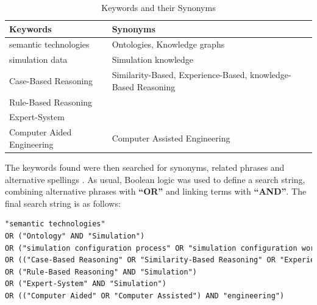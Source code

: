             \begin{table}[h]
                \centering
        	    {
        	    \begin{tabular}{ | m{5.5cm} | m{9cm} | }
                    \hline
                    \rowcolor{teal!30} \textbf{Keywords} & \textbf{Synonyms} \\
                    
                    \hline
                    semantic technologies  & Ontologies, Knowledge graphs\\
                    
                    \hline
                    simulation data & Simulation knowledge\\
                    
                    \hline
                    Case-Based Reasoning  & Similarity-Based, Experience-Based, knowledge-Based Reasoning\\
                    
                    \hline
                    Rule-Based Reasoning  & \\
                    
                    \hline
                    Expert-System  & \\
                    
                    \hline
                    Computer Aided Engineering  & Computer Assisted Engineering\\
                    
                    \hline
                \end{tabular}}
                \caption{\label{tab:keyw-syno} Keywords and their Synonyms}
            \end{table}

            The keywords found were then searched for synonyms, related phrases and alternative spellings \cite{budgen2006performing}. As usual, Boolean logic was used to define a search string, combining alternative phrases with \textbf{“OR”} and linking terms with \textbf{“AND”}. The final search string is as follows:\\

            \begin{lstlisting}[language=XML, caption=Generated Query, label={lst:gen-query}]
"semantic technologies" 
OR ("Ontology" AND "Simulation")
OR ("simulation configuration process" OR "simulation configuration workflow" OR "simulation configuration knowledge")
OR (("Case-Based Reasoning" OR "Similarity-Based Reasoning" OR "Experience-Based Reasoning" OR "knowledge-Based Reasoning") AND "Simulation")
OR ("Rule-Based Reasoning" AND "Simulation")
OR ("Expert-System" AND "Simulation")
OR (("Computer Aided" OR "Computer Assisted") AND "engineering")
            \end{lstlisting}

